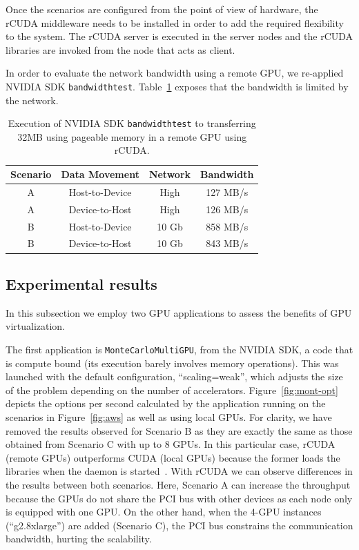 \documentclass[a4paper,twoside]{article}
\begin{document}
Once the scenarios are configured from the point of view of hardware, 
the {rCUDA} middleware needs to be installed in order to add 
the required flexibility to the system. The {rCUDA} server is 
executed in the server nodes and the {rCUDA} libraries are invoked from the node that acts as client.

In order to evaluate the network bandwidth using a remote GPU, we re-applied NVIDIA SDK {\tt bandwidthtest}.
Table~\ref{table:bwtrcuda} exposes that the bandwidth is limited by the network.

\begin{table}[htb]
\renewcommand{\arraystretch}{1.3}
\caption{Execution of NVIDIA SDK {\tt bandwidthtest} to transferring 32MB using pageable memory in a remote GPU using {rCUDA}.}
\label{table:bwtrcuda}
\tabcolsep=0.09cm
\begin{center}\begin{tabular}{cccc}
Scenario &  Data Movement & Network & Bandwidth \\ \hline \hline
A & Host-to-Device & High& 127 MB/s \\ \hline
A & Device-to-Host & High& 126 MB/s\\ \hline
B & Host-to-Device & 10 Gb& 858 MB/s\\ \hline
B & Device-to-Host & 10 Gb& 843 MB/s\\ \hline
\end{tabular}\end{center}\end{table}

\subsection{Experimental results}
In this subsection we employ two GPU applications to assess the benefits of GPU virtualization.

The first application is {\tt MonteCarloMultiGPU}, from the NVIDIA SDK, a code that is compute bound (its execution barely involves memory operations). 
This was launched with the default configuration, ``scaling=weak'', which adjusts the size of the problem depending on the number of accelerators.
Figure~\ref{fig:mont-opt} depicts the options per second calculated by the application running on the scenarios in Figure~\ref{fig:aws} as well as using local GPUs. 
For clarity, we have removed the results observed for Scenario B as they are exactly the same as those obtained from Scenario C with up to 8 GPUs. 
In this particular case, rCUDA (remote GPUs) outperforms CUDA (local GPUs) because the former loads the libraries when the daemon is started~\cite{tonithesis}.
With rCUDA we can observe differences in the results between both scenarios. 
Here, Scenario A can increase the throughput because the GPUs do not share the PCI bus with other devices as each node only is equipped with one GPU.
On the other hand, when the 4-GPU instances (``g2.8xlarge'') are added (Scenario C), the PCI bus constrains the communication bandwidth, hurting the scalability.
\end{document}
